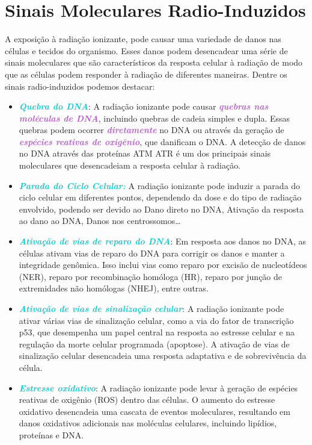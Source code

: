 \documentclass[11pt,a4paper]{article}
\begin{document}
\section{Sinais Moleculares Radio-Induzidos}

	A exposição à radiação ionizante, pode causar uma variedade de danos nas células e tecidos do organismo. Esses danos podem desencadear uma série de sinais moleculares que são característicos da resposta celular à radiação de modo que as células podem responder à radiação de diferentes maneiras. Dentre os sinais radio-induzidos podemos destacar:

	\begin{itemize}
		\item \textcolor{DarkTurquoise}{\textbf{\textit{Quebra do DNA}}}: A radiação ionizante pode causar \textcolor{MediumOrchid}{\textbf{\textit{quebras nas moléculas de DNA}}}, incluindo quebras de cadeia simples e dupla. Essas quebras podem ocorrer \textcolor{MediumOrchid}{\textbf{\textit{diretamente}}} no DNA ou através da geração de \textcolor{MediumOrchid}{\textbf{\textit{espécies reativas de oxigênio}}}, que danificam o DNA. A detecção de danos no DNA através das proteínas ATM ATR é um dos principais sinais moleculares que desencadeiam a resposta celular à radiação.			
		\item \textcolor{DarkTurquoise}{\textbf{\textit{Parada do Ciclo Celular:}}} A radiação ionizante pode induzir a parada do ciclo celular em diferentes pontos, dependendo da dose e do tipo de radiação envolvido, podendo ser devido ao Dano direto no DNA, Ativação da resposta ao dano ao DNA, Danos nos centrossomos\dots
		\item \textcolor{DarkTurquoise}{\textbf{\textit{Ativação de vias de reparo do DNA}}}: Em resposta aos danos no DNA, as células ativam vias de reparo do DNA para corrigir os danos e manter a integridade genômica. Isso inclui vias como reparo por excisão de nucleotídeos (NER), reparo por recombinação homóloga (HR), reparo por junção de extremidades não homólogas (NHEJ), entre outras.			
		\item \textcolor{DarkTurquoise}{\textbf{\textit{Ativação de vias de sinalização celular}}}: A radiação ionizante pode ativar várias vias de sinalização celular, como a via do fator de transcrição p53, que desempenha um papel central na resposta ao estresse celular e na regulação da morte celular programada (apoptose). A ativação de vias de sinalização celular desencadeia uma resposta adaptativa e de sobrevivência da célula.			
		\item \textcolor{DarkTurquoise}{\textbf{\textit{Estresse oxidativo}}}: A radiação ionizante pode levar à geração de espécies reativas de oxigênio (ROS) dentro das células. O aumento do estresse oxidativo desencadeia uma cascata de eventos moleculares, resultando em danos oxidativos adicionais nas moléculas celulares, incluindo lipídios, proteínas e DNA.			

\end{itemize}
\end{document}
